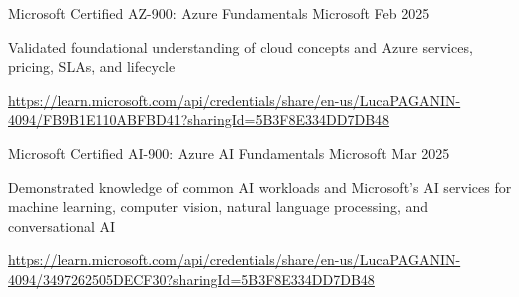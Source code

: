 


\begin{cventries}

\ifenglish
\cventry
{Microsoft Certified} %
{AZ-900: Azure Fundamentals} %
{Microsoft} %
{Feb 2025} %
{ %
\begin{cvitems}
  \item {Validated foundational understanding of cloud concepts and Azure services, pricing, SLAs, and lifecycle}
  \item {\url{https://learn.microsoft.com/api/credentials/share/en-us/LucaPAGANIN-4094/FB9B1E110ABFBD41?sharingId=5B3F8E334DD7DB48}}
\end{cvitems}
}

\cventry
{Microsoft Certified} %
{AI-900: Azure AI Fundamentals} %
{Microsoft} %
{Mar 2025} %
{ %
\begin{cvitems}
  \item {Demonstrated knowledge of common AI workloads and Microsoft's AI services for machine learning, computer vision, natural language processing, and conversational AI}
  \item {\url{https://learn.microsoft.com/api/credentials/share/en-us/LucaPAGANIN-4094/3497262505DECF30?sharingId=5B3F8E334DD7DB48}}
\end{cvitems}
}


\end{cventries}
